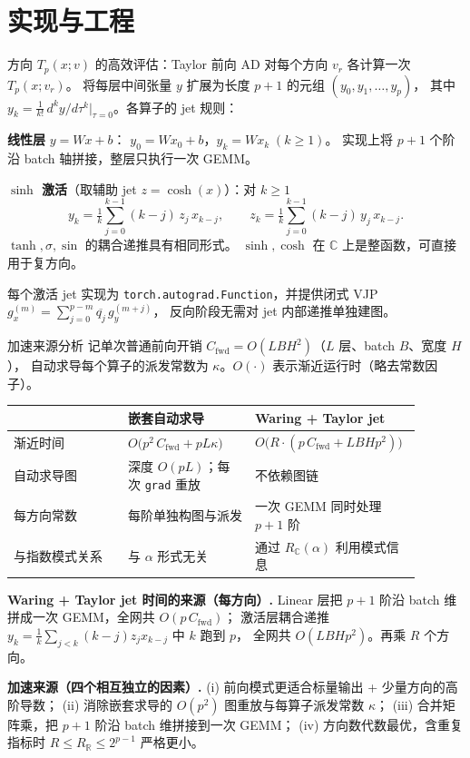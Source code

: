 \documentclass[10pt,aspectratio=169]{beamer}
\newcommand{\R}{\mathbb{R}}
\newcommand{\C}{\mathbb{C}}
\newcommand{\Tp}{T_p}
\begin{document}
\section{实现与工程}

\begin{frame}{方向 $\Tp(x;v)$ 的高效评估：Taylor 前向 AD}
  对每个方向 $v_r$ 各计算一次 $\Tp(x;v_r)$。
  将每层中间张量 $y$ 扩展为长度 $p+1$ 的元组 $(y_0,y_1,\dots,y_p)$，
  其中 $y_k=\tfrac{1}{k!}\,d^k y/d\tau^k|_{\tau=0}$。各算子的 jet 规则：

  \medskip
  \textbf{线性层} $y=Wx+b$：\;
  $y_0=Wx_0+b$，\;$y_k=Wx_k\;(k\ge 1)$。
  实现上将 $p+1$ 个阶沿 batch 轴拼接，整层只执行一次 GEMM。

  \medskip
  \textbf{$\sinh$ 激活}（取辅助 jet $z=\cosh(x)$）：对 $k\ge 1$
  \[
    y_k = \tfrac1k\sum_{j=0}^{k-1}(k-j)\,z_j\,x_{k-j},
    \qquad
    z_k = \tfrac1k\sum_{j=0}^{k-1}(k-j)\,y_j\,x_{k-j}.
  \]
  $\tanh,\sigma,\sin$ 的耦合递推具有相同形式。
  $\sinh,\cosh$ 在 $\C$ 上是整函数，可直接用于复方向。

  \medskip
  每个激活 jet 实现为 \texttt{torch.autograd.Function}，并提供闭式 VJP
  $g_x^{(m)}=\sum_{j=0}^{p-m}\overline{q_j}\,g_y^{(m+j)}$，
  反向阶段无需对 jet 内部递推单独建图。
\end{frame}

\begin{frame}{加速来源分析}
  记单次普通前向开销 $C_{\mathrm{fwd}}=O(L B H^2)$（$L$ 层、batch $B$、宽度 $H$），
  自动求导每个算子的派发常数为 $\kappa$。$O(\cdot)$ 表示渐近运行时（略去常数因子）。

  \medskip
  \begin{tabular}{p{0.27\linewidth}p{0.30\linewidth}p{0.32\linewidth}}
    \toprule
    & \textbf{嵌套自动求导} & \textbf{Waring + Taylor jet} \\
    \midrule
    渐近时间 &
    $O\!\big(p^2\,C_{\mathrm{fwd}} + p L\kappa\big)$ &
    $O\!\big(R\cdot(p\,C_{\mathrm{fwd}} + L B H p^2)\big)$ \\[2pt]
    自动求导图 & 深度 $O(pL)$；每次 \texttt{grad} 重放 & 不依赖图链 \\[2pt]
    每方向常数 & 每阶单独构图与派发 & 一次 GEMM 同时处理 $p+1$ 阶 \\[2pt]
    与指数模式关系 & 与 $\alpha$ 形式无关 & 通过 $R_{\C}(\alpha)$ 利用模式信息 \\
    \bottomrule
  \end{tabular}

  \medskip
  \textbf{Waring + Taylor jet 时间的来源（每方向）.}\;
  Linear 层把 $p+1$ 阶沿 batch 维拼成一次 GEMM，全网共 $O(p\,C_{\mathrm{fwd}})$；
  激活层耦合递推 $y_k=\frac{1}{k}\sum_{j<k}(k-j)z_j x_{k-j}$ 中 $k$ 跑到 $p$，
  全网共 $O(L B H p^2)$。再乘 $R$ 个方向。

  \medskip
  \textbf{加速来源（四个相互独立的因素）.}\;
  (i) 前向模式更适合标量输出 + 少量方向的高阶导数；
  (ii) 消除嵌套求导的 $O(p^2)$ 图重放与每算子派发常数 $\kappa$；
  (iii) 合并矩阵乘，把 $p+1$ 阶沿 batch 维拼接到一次 GEMM；
  (iv) 方向数代数最优，含重复指标时 $R\le R_{\R}\le 2^{p-1}$ 严格更小。
\end{frame}
\end{document}
